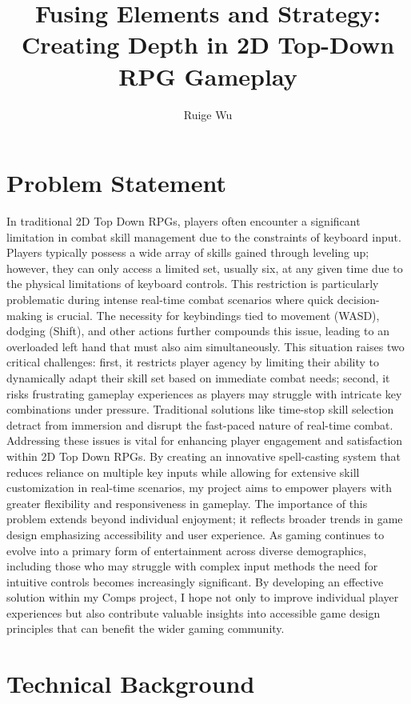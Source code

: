 \documentclass[10pt,twocolumn]{article}
\title{Fusing Elements and Strategy: \\Creating Depth in 2D Top-Down RPG Gameplay}
\author{Ruige Wu}
\affiliation{Occidental College}
\begin{document}
\maketitle

\section{Problem Statement}
In traditional 2D Top Down RPGs, players often encounter a significant limitation in combat skill management due to the constraints of keyboard input. Players typically possess a wide array of skills gained through leveling up; however, they can only access a limited set, usually six, at any given time due to the physical limitations of keyboard controls. This restriction is particularly problematic during intense real-time combat scenarios where quick decision-making is crucial. The necessity for keybindings tied to movement (WASD), dodging (Shift), and other actions further compounds this issue, leading to an overloaded left hand that must also aim simultaneously.
This situation raises two critical challenges: first, it restricts player agency by limiting their ability to dynamically adapt their skill set based on immediate combat needs; second, it risks frustrating gameplay experiences as players may struggle with intricate key combinations under pressure. Traditional solutions like time-stop skill selection detract from immersion and disrupt the fast-paced nature of real-time combat.
Addressing these issues is vital for enhancing player engagement and satisfaction within 2D Top Down RPGs. By creating an innovative spell-casting system that reduces reliance on multiple key inputs while allowing for extensive skill customization in real-time scenarios, my project aims to empower players with greater flexibility and responsiveness in gameplay.
The importance of this problem extends beyond individual enjoyment; it reflects broader trends in game design emphasizing accessibility and user experience. As gaming continues to evolve into a primary form of entertainment across diverse demographics, including those who may struggle with complex input methods the need for intuitive controls becomes increasingly significant. By developing an effective solution within my Comps project, I hope not only to improve individual player experiences but also contribute valuable insights into accessible game design principles that can benefit the wider gaming community.

\section{Technical Background}
\end{document}
